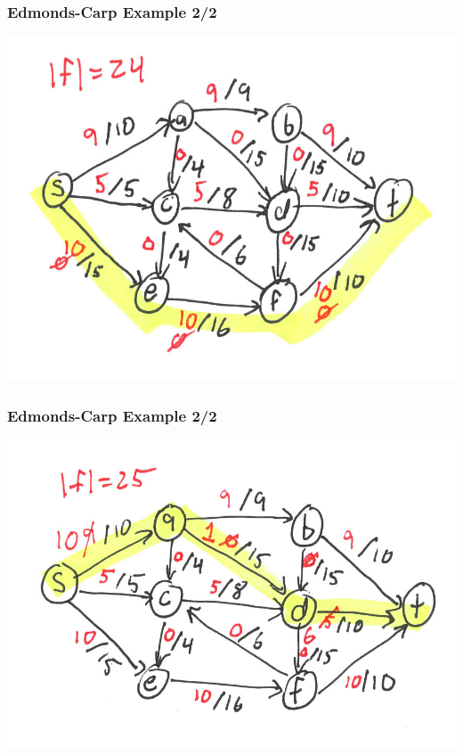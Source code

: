 \documentclass{beamer}
\begin{document}
\begin{frame} \frametitle{Edmonds-Carp Example 2/2}
\begin{center}
  \includegraphics[scale=1]{ek-2-4.png}
\end{center}
\end{frame}

\begin{frame} \frametitle{Edmonds-Carp Example 2/2}
\begin{center}
  \includegraphics[scale=1]{ek-2-5.png}
\end{center}
\end{frame}
\end{document}
